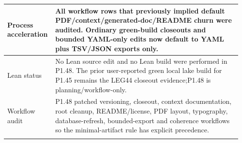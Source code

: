 \begin{longtable}{L{0.18\linewidth} L{0.78\linewidth}}
\hline
\addlinespace[0.24em]
Process acceleration & All workflow rows that previously implied default PDF/\allowbreak{}context/\allowbreak{}generated-doc/\allowbreak{}README churn were audited. Ordinary green-build closeouts and bounded YAML-only edits now default to YAML plus TSV/\allowbreak{}JSON exports only.\\
\hline
\addlinespace[0.24em]
Lean status & No Lean source edit and no Lean build were performed in P1.48. The prior user-reported green local lake build for P1.45 remains the LEG44 closeout evidence;\newline P1.48 is planning/\allowbreak{}workflow-only.\\
\hline
\addlinespace[0.24em]
Workflow audit & P1.48 patched versioning, closeout, context documentation, root cleanup, README/\allowbreak{}license, PDF layout, typography, database-refresh, bounded-export and coherence workflows so the minimal-artifact rule has explicit precedence.\\
\hline
\addlinespace[0.24em]
\end{longtable}
\normalsize

